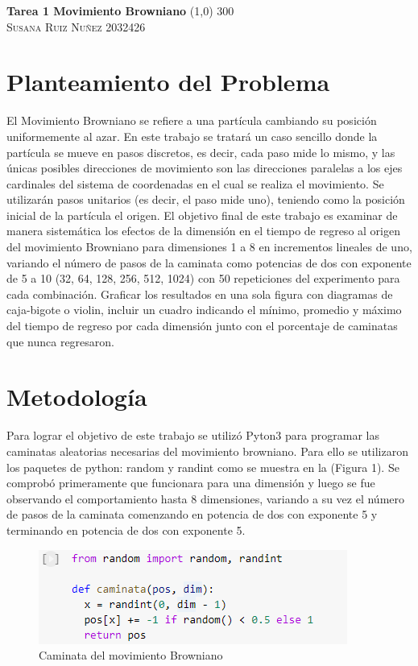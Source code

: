 \documentclass{article}
\begin{document}
	\begin{center}
	\huge{\textbf{Tarea 1 Movimiento Browniano}}
	\line(1,0) {300}\\
	
	\textsc{ \Large Susana Ruiz Nuñez} 
	\textsc{ \Large 2032426}
	\end{center}


\section{Planteamiento del Problema} 
El Movimiento Browniano se refiere a una partícula cambiando su posición uniformemente al azar. En este trabajo se tratará un caso sencillo donde la partícula se mueve en pasos discretos, es decir, cada paso mide lo mismo, y las únicas posibles direcciones de movimiento son las direcciones paralelas a los ejes cardinales del sistema de coordenadas en el cual se realiza el movimiento. Se utilizarán pasos unitarios (es decir, el paso mide uno), teniendo como la posición inicial de la partícula el origen. El objetivo final de este trabajo es examinar de manera sistemática los efectos de la dimensión en el tiempo de regreso al origen del movimiento Browniano para dimensiones 1 a 8 en incrementos lineales de uno, variando el número de pasos de la caminata como potencias de dos con exponente de 5 a 10 (32, 64, 128, 256, 512, 1024) con 50 repeticiones del experimento para cada combinación. Graficar los resultados en una sola figura con diagramas de caja-bigote o violin, incluir un cuadro indicando el mínimo, promedio y máximo del tiempo de regreso por cada dimensión junto con el porcentaje de caminatas que nunca regresaron.

\section{Metodología}
Para lograr el objetivo de este trabajo se utilizó Pyton3 para programar las caminatas aleatorias necesarias del movimiento browniano. Para ello se utilizaron los paquetes de python: random y randint como se muestra en la (Figura 1). Se comprobó primeramente que funcionara para una dimensión y luego se fue observando el comportamiento hasta 8 dimensiones, variando a su vez el número de pasos de la caminata comenzando en potencia de dos con exponente 5 y terminando en potencia de dos con exponente 5.  

\begin{figure}[H]
    \centering

    \includegraphics[scale=0.7]{Caminata.png}
    \caption{Caminata del movimiento Browniano}
    \label{fig:f1}
\end{figure}
     
\end{document}
